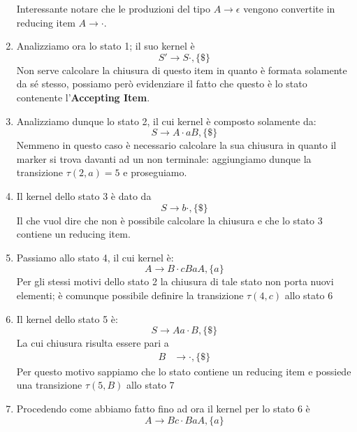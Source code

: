 \documentclass[class=book, crop=false, oneside, 12pt]{standalone}
\begin{document}
\begin{enumerate}
    Interessante notare che le produzioni del tipo \(A \to \epsilon\) vengono convertite in reducing item \(A \to \cdot\).
    \item Analizziamo ora lo stato 1; il suo kernel è 
    \begin{equation*}
        S' \to S \cdot, \{\$\}    
    \end{equation*}
    Non serve calcolare la chiusura di questo item in quanto è formata solamente da sé stesso, possiamo però evidenziare il fatto che questo è lo stato contenente l'\textbf{Accepting Item}.
    \item Analizziamo dunque lo stato 2, il cui kernel è composto solamente da:
    \begin{equation*}
        S \to  A \cdot aB, \{\$\}
    \end{equation*}
    Nemmeno in questo caso è necessario calcolare la sua chiusura in quanto il marker si trova davanti ad un non terminale: aggiungiamo dunque la transizione \(\tau(2,a)=5 \) e proseguiamo.
    \item Il kernel dello stato 3 è dato da
    \begin{equation*}
        S \to b \cdot, \{\$\}
    \end{equation*}
    Il che vuol dire che non è possibile calcolare la chiusura e che lo stato 3 contiene un reducing item.
    \item Passiamo allo stato 4, il cui kernel è:
    \begin{equation*}
        A \to B \cdot cBaA, \{a\} 
    \end{equation*}
   Per gli stessi motivi dello stato 2 la chiusura di tale stato non porta nuovi elementi; è comunque possibile definire la transizione \(\tau(4,c)\) allo stato 6
    \item Il kernel dello stato 5 è:
    \begin{equation*}
        S \to  Aa \cdot B, \{\$\}
    \end{equation*}
    La cui chiusura risulta essere pari a 
    \begin{align*}
        B &\to \cdot, \{\$\}
    \end{align*}
    Per questo motivo sappiamo che lo stato contiene un reducing item e possiede una transizione \(\tau(5, B)\) allo stato 7
    \item Procedendo come abbiamo fatto fino ad ora il kernel per lo stato 6 è
    \begin{equation*}
        A \to Bc \cdot BaA, \{a\} 
    \end{equation*}

\end{enumerate}
\end{document}
